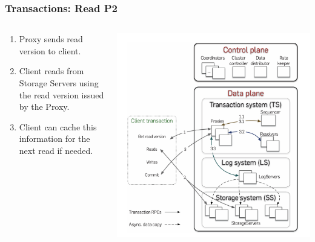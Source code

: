 \begin{frame}
    \frametitle{Transactions: Read P2}
    \begin{columns}
        \begin{column}{0.5\textwidth}
            \begin{enumerate}
    \item Proxy sends read version to client.
    \item Client reads from Storage Servers using the read version issued by the Proxy.
    \item Client can cache this information for the next read if needed.
            \end{enumerate}
        \end{column}
        \begin{column}{0.5\textwidth}
            \centering
            \includegraphics[width=\textwidth]{img/2-Architecture/Architecture and transaction processing.png}
        \end{column}
    \end{columns}
\end{frame}


